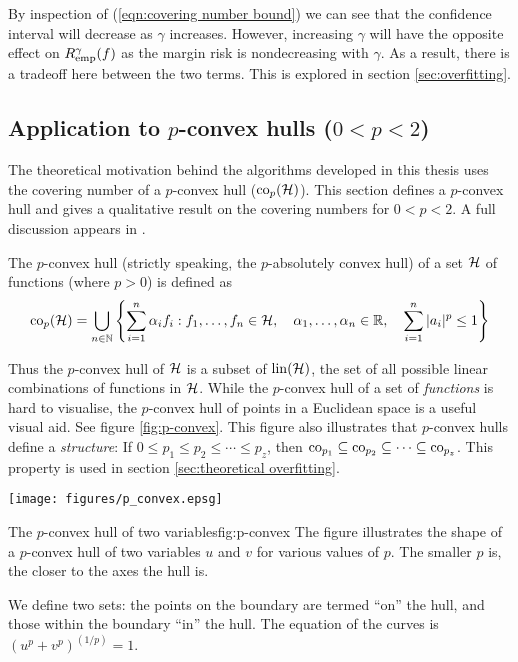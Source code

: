 By inspection of (\ref{eqn:covering number bound}) we can see that the
confidence interval will decrease as $\gamma$ increases.  However,
increasing $\gamma$ will have the opposite effect on
$R_{\mathrm{emp}}^{\gamma}(f)$ as the margin risk is nondecreasing with
$\gamma$.  As a result, there is a tradeoff here between the two
terms.  This is explored in section \ref{sec:overfitting}.

\subsection{Application to $p$-convex hulls ($0 < p < 2$)}
\label{sec:p-convex}

The theoretical motivation behind the algorithms developed in this
thesis uses the covering number of a $p$-convex hull ($\mathrm{co}_p(\mathcal{H})$).
This section defines a $p$-convex hull and gives a qualitative result
on the covering numbers for $0 < p < 2$.  A full discussion appears in
\cite{Williamson99}.

\begin{definition}
\label{def:p-convex hull}
The $p$-convex hull (strictly speaking, the $p$-absolutely convex hull) of
a set $\mathcal{H}$ of functions (where $p>0$) is defined as
%
\begin{equation}
\mathrm{co}_p (\mathcal{H}) =
 \bigcup _{n \in \mathbb{N}}
\left\{
 \sum_{i=1}^{n}
 \alpha _i
f_i : f_1, \ldots, f_n \in \mathcal{H}, \quad
 \alpha _1, \ldots, \alpha _n \in \mathbb{R}, \quad
 \sum_{i=1}^{n} | a_i |^p \leq 1
\right\}
\end{equation}
\end{definition}

Thus the $p$-convex hull of $\mathcal{H}$ is a subset of $\mathrm{lin}(\mathcal{H})$, the
set of all possible linear combinations of functions in $\mathcal{H}$.
While the $p$-convex hull of a set of \emph{functions} is hard to
visualise, the $p$-convex hull of points in a Euclidean space is a
useful visual aid.  See figure \ref{fig:p-convex}.  This figure also
illustrates that $p$-convex hulls define a \emph{structure}:  If $0
\leq p_1 \leq p_2 \leq \cdots \leq p_z$, then $\mathrm{co}_{p_1} \subseteq
\mathrm{co}_{p_2} \subseteq \cdots \subseteq \mathrm{co}_{p_z}$.  This property is
used in section 
\ref{sec:theoretical overfitting}.

\begin{linefigure}
\begin{center}
\texttt{[image: figures/p\_convex.epsg]}
\end{center}
\begin{capt}{The $p$-convex hull of two variables}{fig:p-convex}
The figure illustrates the shape of a $p$-convex hull of two variables $u$
and $v$ for various values of $p$.  The smaller $p$ is, the closer to
the axes the hull is.  

We define two sets: the points on the boundary are termed ``on'' the
hull, and those within the boundary ``in'' the hull.  The equation of
the curves is $\left( u^p + v^p \right) ^{(1/p)} = 1$.
\end{capt}
\end{linefigure}

